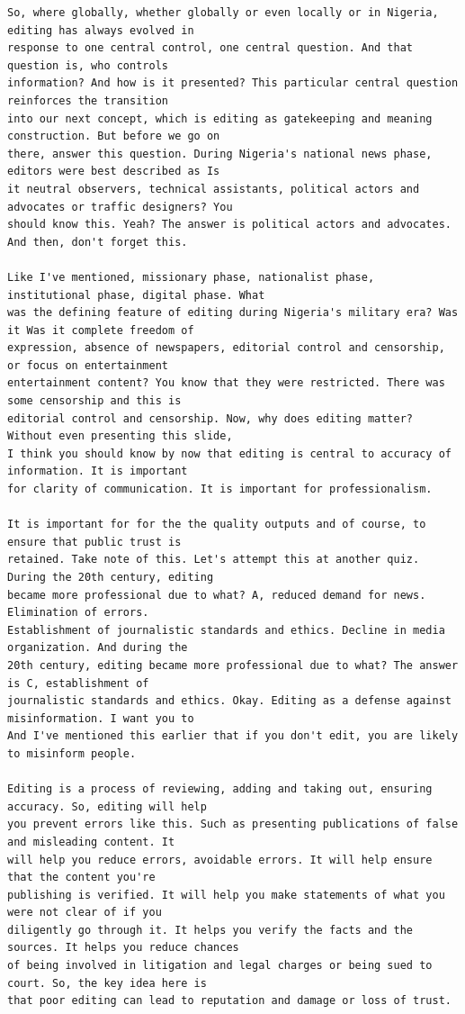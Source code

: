 {\begin{Verbatim}
So, where globally, whether globally or even locally or in Nigeria, editing has always evolved in
response to one central control, one central question. And that question is, who controls
information? And how is it presented? This particular central question reinforces the transition
into our next concept, which is editing as gatekeeping and meaning construction. But before we go on
there, answer this question. During Nigeria's national news phase, editors were best described as Is
it neutral observers, technical assistants, political actors and advocates or traffic designers? You
should know this. Yeah? The answer is political actors and advocates. And then, don't forget this.

Like I've mentioned, missionary phase, nationalist phase, institutional phase, digital phase. What
was the defining feature of editing during Nigeria's military era? Was it Was it complete freedom of
expression, absence of newspapers, editorial control and censorship, or focus on entertainment
entertainment content? You know that they were restricted. There was some censorship and this is
editorial control and censorship. Now, why does editing matter? Without even presenting this slide,
I think you should know by now that editing is central to accuracy of information. It is important
for clarity of communication. It is important for professionalism.

It is important for for the the quality outputs and of course, to ensure that public trust is
retained. Take note of this. Let's attempt this at another quiz. During the 20th century, editing
became more professional due to what? A, reduced demand for news. Elimination of errors.
Establishment of journalistic standards and ethics. Decline in media organization. And during the
20th century, editing became more professional due to what? The answer is C, establishment of
journalistic standards and ethics. Okay. Editing as a defense against misinformation. I want you to
And I've mentioned this earlier that if you don't edit, you are likely to misinform people.

Editing is a process of reviewing, adding and taking out, ensuring accuracy. So, editing will help
you prevent errors like this. Such as presenting publications of false and misleading content. It
will help you reduce errors, avoidable errors. It will help ensure that the content you're
publishing is verified. It will help you make statements of what you were not clear of if you
diligently go through it. It helps you verify the facts and the sources. It helps you reduce chances
of being involved in litigation and legal charges or being sued to court. So, the key idea here is
that poor editing can lead to reputation and damage or loss of trust.


\end{Verbatim}}
